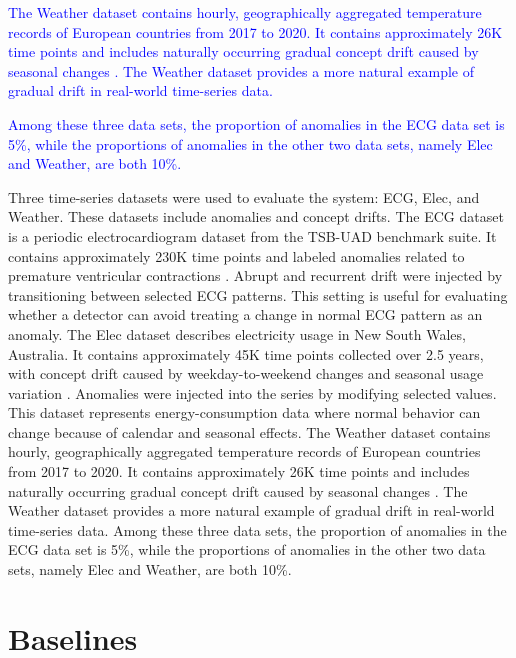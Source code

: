\textcolor{blue}{The Weather dataset contains hourly, geographically aggregated temperature records of European countries from 2017 to 2020. It contains approximately 26K time points and includes naturally occurring gradual concept drift caused by seasonal changes \citep{park2025andri,gelaro2017merra2}. The Weather dataset provides a more natural example of gradual drift in real-world time-series data.}

\textcolor{blue}{Among these three data sets, the proportion of anomalies in the ECG data set is 5\%, while the proportions of anomalies in the other two data sets, namely Elec and Weather, are both 10\%.}


Three time-series datasets were used to evaluate the system: ECG, Elec, and Weather. These datasets include anomalies and concept drifts. The ECG dataset is a periodic electrocardiogram dataset from the TSB-UAD benchmark suite. It contains approximately 230K time points and labeled anomalies related to premature ventricular contractions \citep{park2025andri,paparrizos2022tsbuad}. Abrupt and recurrent drift were injected by transitioning between selected ECG patterns. This setting is useful for evaluating whether a detector can avoid treating a change in normal ECG pattern as an anomaly. The Elec dataset describes electricity usage in New South Wales, Australia. It contains approximately 45K time points collected over 2.5 years, with concept drift caused by weekday-to-weekend changes and seasonal usage variation \citep{park2025andri,bifet2010moa}. Anomalies were injected into the series by modifying selected values. This dataset represents energy-consumption data where normal behavior can change because of calendar and seasonal effects. The Weather dataset contains hourly, geographically aggregated temperature records of European countries from 2017 to 2020. It contains approximately 26K time points and includes naturally occurring gradual concept drift caused by seasonal changes \citep{park2025andri,gelaro2017merra2}. The Weather dataset provides a more natural example of gradual drift in real-world time-series data. Among these three data sets, the proportion of anomalies in the ECG data set is 5\%, while the proportions of anomalies in the other two data sets, namely Elec and Weather, are both 10\%.


\section{Baselines}


